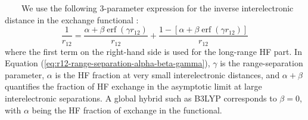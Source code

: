 \documentclass[landscape,a0b,final]{a0poster}
\newcommand{\bindent}{\ \ \ \ }
\newenvironment{poster}{
  \begin{center}
  \begin{minipage}[c]{0.98\textwidth}
}{
  \end{minipage} 
  \end{center}
}
\begin{document}
\begin{poster}
\begin{multicols}{3}
    \bindent We use the following 3-parameter expression for the inverse
    interelectronic distance in the exchange functional
    \cite{yanai_new_2004}:
    \begin{equation}
    \label{eq:r12-range-separation-alpha-beta-gamma}
    \frac{1}{r_{12}} =
    \frac{\alpha + \beta \operatorname{erf} (\gamma r_{12})}{r_{12}} + 
    \frac{1-[\alpha + \beta \operatorname{erf} (\gamma r_{12})]}{r_{12}} 
    \end{equation}
    where the first term on the right-hand side is used for the long-range
    HF part. In Equation (\ref{eq:r12-range-separation-alpha-beta-gamma}),
    $\gamma$ is the range-separation parameter, $\alpha$ is the HF
    fraction at very small interelectronic distances, and $\alpha+\beta$
    quantifies the fraction of HF exchange in the asymptotic limit at
    large interelectronic separations. A global hybrid such as B3LYP
    corresponds to $\beta = 0$, with $\alpha$ being the HF fraction of
    exchange in the functional.


\end{multicols}
\end{poster}
\end{document}
